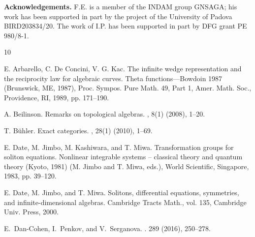 \documentclass[12pt,reqno]{amsart}
\theoremstyle{definition}
\theoremstyle{remark}
\begin{document}
\textbf{Acknowledgements.}
	F.E. is a member of the INDAM group GNSAGA; his work has been supported in part by the project of the University of Padova BIRD203834/20.
	The work of I.P. has been  supported in part by DFG grant PE 980/8-1.	
	
	
	
	
	
    \begin{thebibliography}{10}

E. Arbarello, C. De Concini,   V. G. Kac.
\newblock The infinite wedge representation and the reciprocity law for algebraic curves. 
\newblock Theta functions—Bowdoin 1987 (Brunswick, ME, 1987), Proc. Sympos. Pure Math. 49, Part 1, Amer. Math. Soc., Providence, RI, 1989, pp. 171–190.

A. Beilinson.
\newblock Remarks on topological algebras.
, 8(1) (2008), 1--20.

T. Bühler.
\newblock Exact categories.
, 28(1) (2010), 1--69.



  E. Date, M. Jimbo, M. Kashiwara, and T. Miwa.
  \newblock Transformation groups for soliton
equations. Nonlinear integrable systems – classical theory and quantum theory (Kyoto,
1981) (M. Jimbo and T. Miwa, eds.), World Scientific, Singapore, 1983, pp. 39–120.

E. Date, M. Jimbo, and T. Miwa.
\newblock Solitons, differential equations, symmetries, and
infinite-dimensional algebras. Cambridge Tracts Math., vol. 135, Cambridge Univ.
Press, 2000.

E.~{Dan-Cohen}, I.~{Penkov}, and V.~{Serganova}.
.
  289 (2016), 250--278.




\end{thebibliography}
\end{document}
